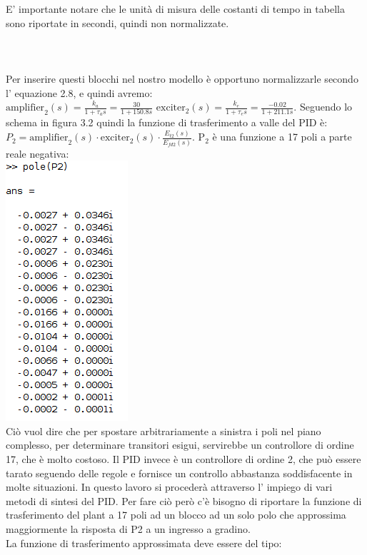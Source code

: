 \documentclass[Lau,noexaminfo]{sapthesis}
\begin{document}
 	E' importante notare che le unità di misura delle costanti di tempo in tabella sono riportate in secondi, quindi non normalizzate. \\\\\\\\Per inserire questi blocchi nel nostro modello è opportuno normalizzarle secondo l' equazione 2.8, e quindi avremo:\\ $\text{amplifier}_2(s)=\frac{k_a}{1+\tau_as}=\frac{30}{1+150.8s}$ \qquad $\text{exciter}_2(s)=\frac{k_e}{1+\tau_es}=\frac{-0.02}{1+211.1s}$.
 	Seguendo lo schema in figura 3.2 quindi la funzione di trasferimento a valle del PID è:\\
 	$P_2=\text{amplifier}_2(s)\cdot\text{exciter}_2(s)\cdot\frac{E_{t2}(s)}{E_{fd2}(s)}$. $\text{P}_2$ è una funzione a 17 poli a parte reale negativa:\\
 	\includegraphics[height=0.26\textheight]{poli_p2}\\
 	Ciò vuol dire che per spostare arbitrariamente a sinistra i poli nel piano complesso, per determinare transitori esigui, servirebbe un controllore di ordine 17, che è molto costoso. Il PID invece è un controllore di ordine 2, che può essere tarato seguendo delle regole e fornisce un controllo abbastanza soddisfacente in molte situazioni. In questo lavoro si procederà attraverso l' impiego di vari metodi di sintesi del PID. Per fare ciò però c'è bisogno di riportare la funzione di trasferimento del plant a 17 poli ad un blocco ad un solo polo che approssima maggiormente la risposta di P2 a un ingresso a gradino.\\
 	La funzione di trasferimento approssimata deve essere del tipo:\\
\end{document}
